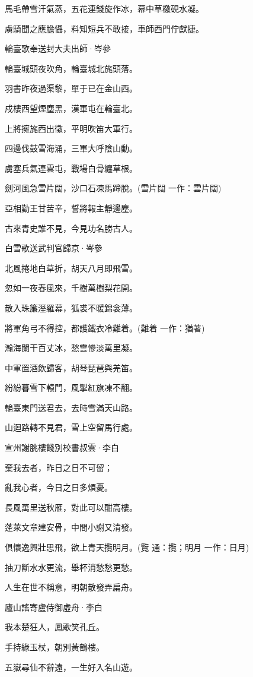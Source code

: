 \documentclass[12pt,a4paper]{ctexbook}
\begin{document}
馬毛帶雪汗氣蒸，五花連錢旋作冰，幕中草檄硯水凝。\par
虜騎聞之應膽懾，料知短兵不敢接，車師西門佇獻捷。\par
輪臺歌奉送封大夫出師·岑參\par
輪臺城頭夜吹角，輪臺城北旄頭落。\par
羽書昨夜過渠黎，單于已在金山西。\par
戍樓西望煙塵黑，漢軍屯在輪臺北。\par
上將擁旄西出徵，平明吹笛大軍行。\par
四邊伐鼓雪海涌，三軍大呼陰山動。\par
虜塞兵氣連雲屯，戰場白骨纏草根。\par
劍河風急雪片闊，沙口石凍馬蹄脫。(雪片闊 一作：雲片闊)\par
亞相勤王甘苦辛，誓將報主靜邊塵。\par
古來青史誰不見，今見功名勝古人。\par
白雪歌送武判官歸京·岑參\par
北風捲地白草折，胡天八月即飛雪。\par
忽如一夜春風來，千樹萬樹梨花開。\par
散入珠簾溼羅幕，狐裘不暖錦衾薄。\par
將軍角弓不得控，都護鐵衣冷難着。(難着 一作：猶著)\par
瀚海闌干百丈冰，愁雲慘淡萬里凝。\par
中軍置酒飲歸客，胡琴琵琶與羌笛。\par
紛紛暮雪下轅門，風掣紅旗凍不翻。\par
輪臺東門送君去，去時雪滿天山路。\par
山迴路轉不見君，雪上空留馬行處。\par
宣州謝脁樓餞別校書叔雲·李白\par
棄我去者，昨日之日不可留；\par
亂我心者，今日之日多煩憂。\par
長風萬里送秋雁，對此可以酣高樓。\par
蓬萊文章建安骨，中間小謝又清發。\par
俱懷逸興壯思飛，欲上青天攬明月。(覽 通：攬；明月 一作：日月)\par
抽刀斷水水更流，舉杯消愁愁更愁。\par
人生在世不稱意，明朝散發弄扁舟。\par
廬山謠寄盧侍御虛舟·李白\par
我本楚狂人，鳳歌笑孔丘。\par
手持綠玉杖，朝別黃鶴樓。\par
五嶽尋仙不辭遠，一生好入名山遊。\par
\end{document}
